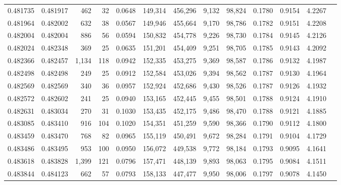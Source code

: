 \begin{tabular}{rrrrrrrrrrrrr}
0.481735 & 0.481917 &   462 &    32 &                                     0.0648 & 149,314 & 456,296 &   9,132 &  98,824 & 0.1780 & 0.9154 & 4.2267 \\
0.481964 & 0.482002 &   632 &    38 &                                     0.0567 & 149,946 & 455,664 &   9,170 &  98,786 & 0.1782 & 0.9151 & 4.2208 \\
0.482004 & 0.482004 &   886 &    56 &                                     0.0594 & 150,832 & 454,778 &   9,226 &  98,730 & 0.1784 & 0.9145 & 4.2126 \\
0.482024 & 0.482348 &   369 &    25 &                                     0.0635 & 151,201 & 454,409 &   9,251 &  98,705 & 0.1785 & 0.9143 & 4.2092 \\
0.482366 & 0.482457 & 1,134 &   118 &                                     0.0942 & 152,335 & 453,275 &   9,369 &  98,587 & 0.1786 & 0.9132 & 4.1987 \\
0.482498 & 0.482498 &   249 &    25 &                                     0.0912 & 152,584 & 453,026 &   9,394 &  98,562 & 0.1787 & 0.9130 & 4.1964 \\
0.482569 & 0.482569 &   340 &    36 &                                     0.0957 & 152,924 & 452,686 &   9,430 &  98,526 & 0.1787 & 0.9126 & 4.1932 \\
0.482572 & 0.482602 &   241 &    25 &                                     0.0940 & 153,165 & 452,445 &   9,455 &  98,501 & 0.1788 & 0.9124 & 4.1910 \\
0.482631 & 0.483034 &   270 &    31 &                                     0.1030 & 153,435 & 452,175 &   9,486 &  98,470 & 0.1788 & 0.9121 & 4.1885 \\
0.483085 & 0.483410 &   916 &   104 &                                     0.1020 & 154,351 & 451,259 &   9,590 &  98,366 & 0.1790 & 0.9112 & 4.1800 \\
0.483459 & 0.483470 &   768 &    82 &                                     0.0965 & 155,119 & 450,491 &   9,672 &  98,284 & 0.1791 & 0.9104 & 4.1729 \\
0.483486 & 0.483495 &   953 &   100 &                                     0.0950 & 156,072 & 449,538 &   9,772 &  98,184 & 0.1793 & 0.9095 & 4.1641 \\
0.483618 & 0.483828 & 1,399 &   121 &                                     0.0796 & 157,471 & 448,139 &   9,893 &  98,063 & 0.1795 & 0.9084 & 4.1511 \\
0.483844 & 0.484123 &   662 &    57 &                                     0.0793 & 158,133 & 447,477 &   9,950 &  98,006 & 0.1797 & 0.9078 & 4.1450 \\

\end{tabular}
